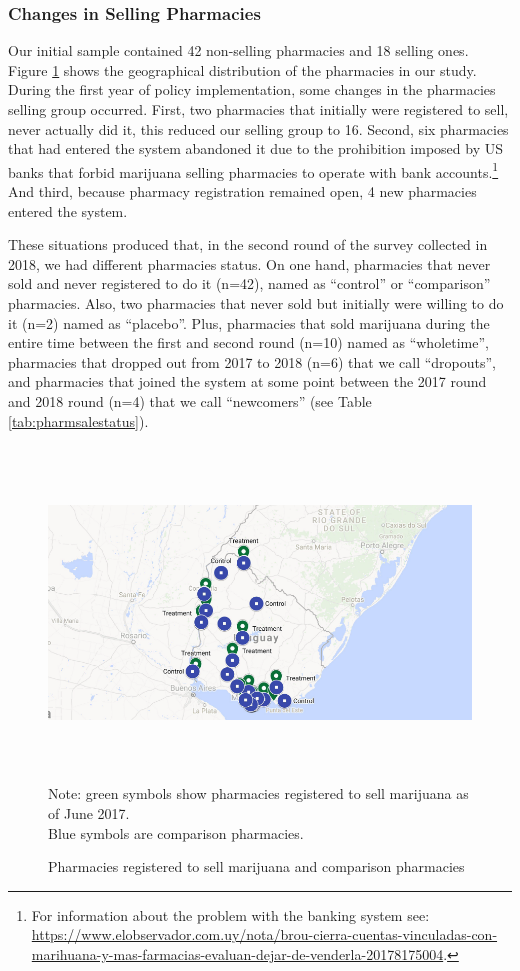 \documentclass[11pt]{article}
\begin{document}
\subsubsection{Changes in Selling Pharmacies}
Our initial sample contained 42 non-selling pharmacies and 18 selling ones. Figure \ref{fig:ctrltrtpharms_1} shows the geographical distribution of the pharmacies in our study. During the first year of policy implementation, some changes in the pharmacies selling group occurred. First, two pharmacies that initially were registered to sell, never actually did it, this reduced our selling group to 16.  Second, six pharmacies that had entered the system abandoned it due to the prohibition imposed by US banks that forbid marijuana selling pharmacies to operate with bank accounts.\footnote{For information about the problem with the banking system see: \url{https://www.elobservador.com.uy/nota/brou-cierra-cuentas-vinculadas-con-marihuana-y-mas-farmacias-evaluan-dejar-de-venderla-20178175004}.} And third, because pharmacy registration remained open, 4 new pharmacies entered the system.

These situations produced that, in the second round of the survey collected in 2018, we had different pharmacies status. On one hand, pharmacies that never sold and never registered to do it (n=42), named as ``control'' or ``comparison'' pharmacies. Also, two pharmacies that never sold but initially were willing to do it (n=2) named as ``placebo''. Plus, pharmacies that sold marijuana during the entire time between the first and second round (n=10) named as ``wholetime'', pharmacies that dropped out from 2017 to 2018 (n=6) that we call ``dropouts'', and pharmacies that joined the system at some point between the 2017 round and 2018 round (n=4) that we call ``newcomers'' (see Table \ref{tab:pharmsalestatus}).

\begin{figure}[htpb!]
    \centering
    \label{fig:ctrltrtpharms_1}
    \caption{Pharmacies registered to sell marijuana and comparison pharmacies}
    \includegraphics[width=6.5in,height=3.4851in]{./media/country.png}
\footnotesize{Note: green symbols show pharmacies registered to sell marijuana as of June 2017. \\ Blue symbols are comparison pharmacies.}
\end{figure}
\end{document}
